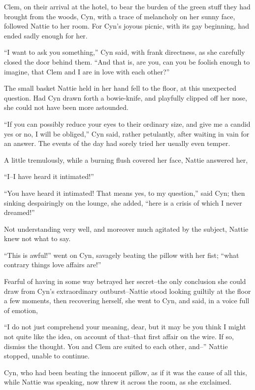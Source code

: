  Clem, on their arrival at the hotel, to bear the burden of the
green stuff they had brought from the woods, Cyn, with a trace of
melancholy on her sunny face, followed Nattie to her room. For Cyn's
joyous picnic, with its gay beginning, had ended sadly enough for her.

``I want to ask you something,'' Cyn said, with frank directness, as she
carefully closed the door behind them. ``And that is, are you, can you be
foolish enough to imagine, that Clem and I are in love with each other?''

The small basket Nattie held in her hand fell to the floor, at this
unexpected question. Had Cyn drawn forth a bowie-knife, and playfully
clipped off her nose, she could not have been more astounded.

``If you can possibly reduce your eyes to their ordinary size, and give
me a candid yes or no, I will be obliged,'' Cyn said, rather petulantly,
after waiting in vain for an answer. The events of the day had sorely
tried her usually even temper.

A little tremulously, while a burning flush covered her face, Nattie
answered her,

``I--I have heard it intimated!''

``You have heard it intimated! That means yes, to my question,'' said Cyn;
then sinking despairingly on the lounge, she added, ``here is a crisis of
which I never dreamed!''

Not understanding very well, and moreover much agitated by the subject,
Nattie knew not what to say.

``This is awful!'' went on Cyn, savagely beating the pillow with her fist;
``what contrary things love affairs are!''

Fearful of having in some way betrayed her secret--the only conclusion
she could draw from Cyn's extraordinary outburst--Nattie stood looking
guiltily at the floor a few moments, then recovering herself, she went
to Cyn, and said, in a voice full of emotion,

``I do not just comprehend your meaning, dear, but it may be you think I
might not quite like the idea, on account of that--that first affair on
the wire. If so, dismiss the thought. You and Clem are suited to each
other, and--'' Nattie stopped, unable to continue.

Cyn, who had been beating the innocent pillow, as if it was the cause of
all this, while Nattie was speaking, now threw it across the room, as
she exclaimed.

